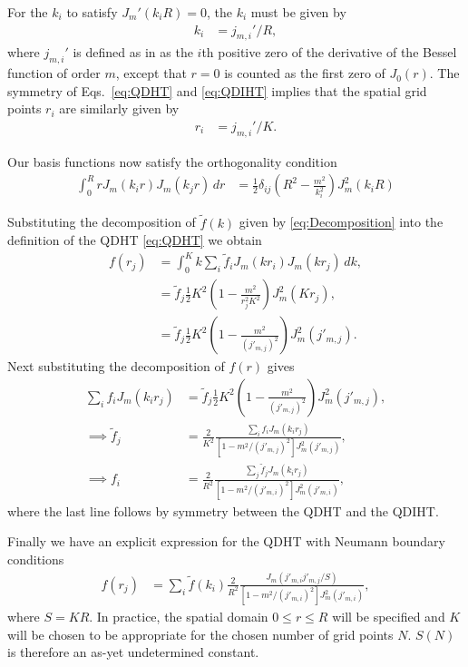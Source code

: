 \documentclass[aip,amsmath,amssymb,reprint,twocolumn]{revtex4-1}
\begin{document}
For the $k_i$ to satisfy $J_m'(k_i R) = 0$, the $k_i$ must be given by
\begin{align}
  k_i &= j_{m,i}'/R,
\end{align}
where $j_{m,i}'$ is defined as in \citet{Abramowitz:1972} as the $i$th positive zero of the derivative of the Bessel function of order $m$, except that $r=0$ is counted as the first zero of $J_0(r)$.  The symmetry of Eqs.~\eqref{eq:QDHT} and \eqref{eq:QDIHT} implies that the spatial grid points $r_i$ are similarly given by
\begin{align}
  r_i &= j_{m,i}'/K.
\end{align}

Our basis functions now satisfy the orthogonality condition
\begin{align}
  \int_0^R r J_m(k_i r) J_m(k_j r)\, dr &= \frac{1}{2} \delta_{ij} \left(R^2 - \frac{m^2}{k_i^2}\right) J_m^2(k_i R)
\end{align}

Substituting the decomposition of $\tilde{f}(k)$ given by \eqref{eq:Decomposition} into the definition of the QDHT \eqref{eq:QDHT} we obtain
\begin{align}
  f(r_j) &= \int_0^K k \sum_i \tilde{f}_i J_m(k r_i) J_m(k r_j)\, dk, \\
  &= \tilde{f}_j \frac{1}{2}K^2  \left(1 - \frac{m^2}{r_j^2 K^2}\right) J_m^2(K r_j), \\
  &= \tilde{f}_j \frac{1}{2}K^2  \left(1 - \frac{m^2}{(j'_{m,j})^2}\right) J_m^2(j'_{m,j}).
\end{align}
Next substituting the decomposition of $f(r)$ gives
\begin{align}
  \sum_i f_i J_m(k_i r_j) &= \tilde{f}_j \frac{1}{2} K^2 \left(1 - \frac{m^2}{(j'_{m,j})^2}\right) J_m^2(j'_{m,j}), \\
  \implies \tilde{f}_j &= \frac{2}{K^2} \frac{\sum_i f_i J_m(k_i r_j)}{\left[1-m^2/(j'_{m,j})^2\right] J_m^2(j'_{m,j})} , \\
  \implies f_i &= \frac{2}{R^2} \frac{\sum_j \tilde{f}_j J_m(k_i r_j)}{\left[1-m^2/(j'_{m,i})^2\right] J_m^2(j'_{m,i})} ,
\end{align}
where the last line follows by symmetry between the QDHT and the QDIHT.

Finally we have an explicit expression for the QDHT with Neumann boundary conditions
\begin{align}
  f(r_j) &= \sum_i \tilde{f}(k_i) \frac{2}{R^2} \frac{J_m\left(j'_{m,i} j'_{m,j}/S\right)}{\left[1-m^2/(j'_{m,i})^2\right]J_m^2(j'_{m,i})},
\end{align}
where $S = K R$.  In practice, the spatial domain $0 \leq r \leq R$ will be specified and $K$ will be chosen to be appropriate for the chosen number of grid points $N$.  $S(N)$ is therefore an as-yet undetermined constant.
\end{document}
